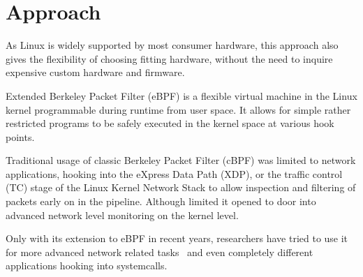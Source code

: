 \section{Approach}

As Linux is widely supported by most consumer hardware, this approach also gives
the flexibility of choosing fitting hardware, without the need to inquire
expensive custom hardware and firmware.

Extended Berkeley Packet Filter (eBPF) is a flexible virtual machine in the
Linux kernel programmable during runtime from user space. It allows for simple
rather restricted programs to be safely executed in the kernel space at various
hook points.


Traditional usage of classic Berkeley Packet Filter (cBPF) was limited to
network applications, hooking into the eXpress Data Path (XDP), or the traffic
control (TC) stage of the Linux Kernel Network Stack to allow inspection and
filtering of packets early on in the pipeline. Although limited it opened to
door into advanced network level monitoring on the kernel level.

Only with its extension to eBPF in recent years, researchers have tried to use
it for more advanced network related tasks~\cite{miano_creating_2018} and even
completely different applications hooking into systemcalls.


